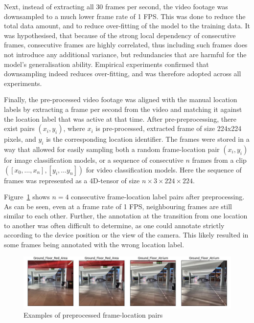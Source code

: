 \documentclass[a4paper]{article}
\begin{document}
  Next, instead of extracting all 30 frames per second, the video footage was
  downsampled to a much lower frame rate of 1 FPS. This was done to reduce the
  total data amount, and to reduce over-fitting of the model to the training
  data. It was hypothesised, that because of the strong local dependency of
  consecutive frames, consecutive frames are highly correlated, thus including
  such frames does not introduce any additional variance, but redundancies that
  are harmful for the model's generalisation ability. Empirical experiments
  confirmed that downsampling indeed reduces over-fitting, and was therefore
  adopted across all experiments.

  Finally, the pre-processed video footage was aligned with the manual location
  labels by extracting a frame per second from the video and matching it against
  the location label that was active at that time. After pre-preprocessing,
  there exist pairs $(x_i, y_i)$, where $x_i$ is pre-processed, extracted frame
  of size 224x224 pixels, and $y_i$ is the corresponding location identifier.
  The frames were stored in a way that allowed for easily sampling both a random
  frame-location pair $(x_i, y_i)$ for image classification models, or a
  sequence of consecutive $n$ frames from a clip $([x_0, \ldots, x_n], [y_i,
  \ldots y_n])$ for video classification models. Here the sequence of frames was
  represented as a 4D-tensor of size $n \times 3 \times 224 \times 224$.

  Figure~\ref{fig:preprocessed-data} shows $n=4$ consecutive frame-location
  label pairs after preprocessing. As can be seen, even at a frame rate of 1
  FPS, neighbouring frames are still similar to each other. Further, the
  annotation at the transition from one location to another was often difficult
  to determine, as one could annotate strictly according to the device position
  or the view of the camera. This likely resulted in some frames being annotated
  with the wrong location label.

  \begin{figure}[ht]
    \centering
    \includegraphics[width=\linewidth]{figures/data-example-batch.jpg}
    \caption{Examples of preprocessed frame-location pairs}
    \label{fig:preprocessed-data}
  \end{figure}
\end{document}
